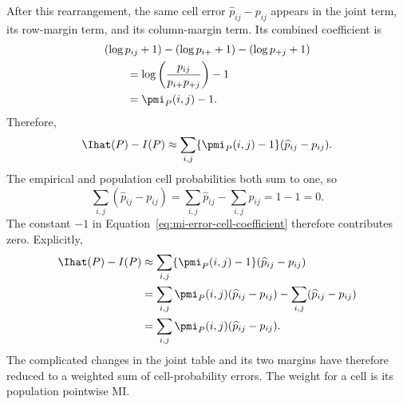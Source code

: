 After this rearrangement, the same cell error \(\widehat p_{ij}-p_{ij}\)
appears in the joint term, its
row-margin term, and its column-margin term. Its combined coefficient is
\begin{align}
  &(\log p_{ij}+1)
  -(\log p_{i+}+1)
  -(\log p_{+j}+1)
  \notag\\
  &\qquad
  =\log\left(\frac{p_{ij}}{p_{i+}p_{+j}}\right)-1
  \notag\\
  &\qquad
  =\pmi_P(i,j)-1.
  \label{eq:mi-error-cell-coefficient}
\end{align}
Therefore,
\begin{equation}
  \Ihat(P)-I(P)
  \approx
  \sum_{i,j}\{\pmi_P(i,j)-1\}(\widehat p_{ij}-p_{ij}).
  \label{eq:mi-error-before-constant-cancellation}
\end{equation}
The empirical and population cell probabilities both sum to one, so
\begin{equation}
  \sum_{i,j}(\widehat p_{ij}-p_{ij})
  =\sum_{i,j}\widehat p_{ij}-\sum_{i,j}p_{ij}
  =1-1=0.
  \label{eq:cell-errors-sum-zero}
\end{equation}
The constant \(-1\) in Equation~\eqref{eq:mi-error-cell-coefficient} therefore
contributes zero. Explicitly,
\begin{align}
  \Ihat(P)-I(P)
  &\approx
  \sum_{i,j}\{\pmi_P(i,j)-1\}(\widehat p_{ij}-p_{ij})
  \notag\\
  &=\sum_{i,j}\pmi_P(i,j)(\widehat p_{ij}-p_{ij})
    -\sum_{i,j}(\widehat p_{ij}-p_{ij})
  \notag\\
  &=\sum_{i,j}
  \pmi_P(i,j)(\widehat p_{ij}-p_{ij}).
  \label{eq:mi-error-from-cell-errors}
\end{align}
The complicated changes in the joint table and its two margins have therefore
reduced to a weighted sum of cell-probability errors. The weight for a cell is
its population pointwise MI.

\medskip
{}

